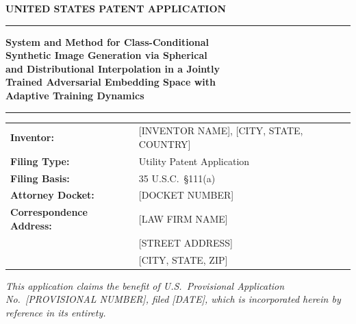 \documentclass[12pt,letterpaper]{article}
\begin{document}

\begin{titlepage}
\centering
\vspace*{0.8in}

{\Large\bfseries UNITED STATES PATENT APPLICATION}

\vspace{0.3in}

\rule{\textwidth}{1.5pt}

\vspace{0.2in}

{\LARGE\bfseries System and Method for Class-Conditional\\[6pt]
Synthetic Image Generation via Spherical\\[6pt]
and Distributional Interpolation in a Jointly\\[6pt]
Trained Adversarial Embedding Space with\\[6pt]
Adaptive Training Dynamics}

\vspace{0.2in}

\rule{\textwidth}{1.5pt}

\vspace{0.4in}

\begin{tabular}{ll}
\textbf{Inventor:}   & [INVENTOR NAME], [CITY, STATE, COUNTRY] \\[6pt]
\textbf{Filing Type:} & Utility Patent Application \\[6pt]
\textbf{Filing Basis:} & 35 U.S.C.\ \S 111(a) \\[6pt]
\textbf{Attorney Docket:} & [DOCKET NUMBER] \\[6pt]
\textbf{Correspondence Address:} & [LAW FIRM NAME] \\
                     & [STREET ADDRESS] \\
                     & [CITY, STATE, ZIP] \\
\end{tabular}

\vspace{0.5in}

\textit{This application claims the benefit of U.S.\ Provisional Application
No.\ [PROVISIONAL NUMBER], filed [DATE], which is incorporated herein by
reference in its entirety.}

\end{titlepage}
\end{document}
